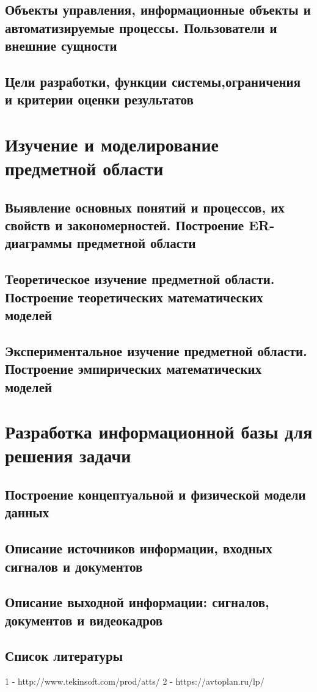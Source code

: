 \documentclass{lstu-diploma}
\begin{document}
\section{Объекты управления, информационные объекты и автоматизируемые процессы.
Пользователи и внешние сущности}

\section{Цели разработки, функции системы,ограничения и критерии оценки результатов}

\chapter{Изучение и моделирование предметной области}
\section{Выявление основных понятий и процессов, их свойств и закономерностей. Построение ER-диаграммы предметной области}

\section{Теоретическое изучение предметной области. Построение теоретических математических моделей}

\section{Экспериментальное изучение предметной области. Построение эмпирических математических моделей}

\chapter{Разработка информационной базы для решения задачи}

\section{Построение концептуальной и физической модели данных}

\section{Описание источников информации, входных сигналов и документов}

\section{Описание выходной информации: сигналов, документов и видеокадров}

\section*{Список литературы}
1 - http://www.tekinsoft.com/prod/atts/
2 - https://avtoplan.ru/lp/
\end{document}
